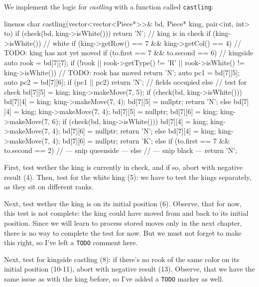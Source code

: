 We implement the logic for \emph{castling} with a function called \texttt{castling}:

\begin{cpp*}{linenos}
char castling(vector<vector<Piece*>>& bd,
              Piece* king, pair<int, int> to)
{
  if (check(bd, king->isWhite())) return 'N'; // king is in check
  if (king->isWhite()) { // white
    if (king->getRow() == 7 && king->getCol() == 4) {
      // TODO: king has not yet moved
      if (to.first == 7 && to.second == 6) { // kingside
        auto rook = bd[7][7];
        if (!rook || rook->getType() != 'R'
                  || rook->isWhite() != king->isWhite()) {
          // TODO: rook has moved
          return 'N';
        }
        auto pc1 = bd[7][5];
        auto pc2 = bd[7][6];
        if (pc1 || pc2) return 'N'; // fields occupied
        else {
          // test for check
          bd[7][5] = king;
          king->makeMove(7, 5);
          if (check(bd, king->isWhite())) {
            bd[7][4] = king;
            king->makeMove(7, 4);
            bd[7][5] = nullptr;
            return 'N';
          } else {
            bd[7][4] = king;
            king->makeMove(7, 4);
            bd[7][5] = nullptr;
          }
          bd[7][6] = king;
          king->makeMove(7, 6);
          if (check(bd, king->isWhite())) {
            bd[7][4] = king;
            king->makeMove(7, 4);
            bd[7][6] = nullptr;
            return 'N';
          } else {
            bd[7][4] = king;
            king->makeMove(7, 4);
            bd[7][6] = nullptr;
          }
          return 'K';
        }
      } else if (to.first == 7 && to.second == 2) {
      // --- snip queenside ---
      }
    }
  } else {
  // --- snip black ---
  }
  return 'N';
}
\end{cpp*}

First, test wether the king is currently in check, and if so, abort with negative result (4).
Then, test for the white king (5): we have to test the kings separately, as they sit on different ranks.

Next, test wether the king is on its initial position (6).
Observe, that for now, this test is not complete: the king could have moved from and back to its initial
position.
Since we will learn to process stored moves only in the next chapter, there is no way to complete the
test for now.
But we must not forget to make this right, so I've left a \texttt{TODO} comment here.

Next, test for kingside castling (8): if there's no rook of the same color on its initial position (10-11),
abort with negative result (13).
Observe, that we have the same issue as with the king before, so I've added a \texttt{TODO} marker as well.

